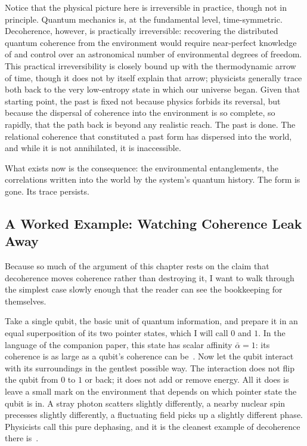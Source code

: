 Notice that the physical picture here is irreversible in practice, though not in principle.
Quantum mechanics is, at the fundamental level, time-symmetric.
Decoherence, however, is practically irreversible: recovering the distributed quantum coherence from the environment would require near-perfect knowledge of and control over an astronomical number of environmental degrees of freedom.
This practical irreversibility is closely bound up with the thermodynamic arrow of time, though it does not by itself explain that arrow; physicists generally trace both back to the very low-entropy state in which our universe began.
Given that starting point, the past is fixed not because physics forbids its reversal, but because the dispersal of coherence into the environment is so complete, so rapidly, that the path back is beyond any realistic reach.
The past is done.
The relational coherence that constituted a past form has dispersed into the world, and while it is not annihilated, it is inaccessible.

What exists now is the consequence: the environmental entanglements, the correlations written into the world by the system's quantum history.
The form is gone.
Its trace persists.

\subsection*{A Worked Example: Watching Coherence Leak Away}

Because so much of the argument of this chapter rests on the claim that decoherence moves coherence rather than destroying it, I want to walk through the simplest case slowly enough that the reader can see the bookkeeping for themselves.

Take a single qubit, the basic unit of quantum information, and prepare it in an equal superposition of its two pointer states, which I will call $0$ and $1$.
In the language of the companion paper, this state has scalar affinity $\bar{\alpha} = 1$: its coherence is as large as a qubit's coherence can be~\citep{AdamsRCT}.
Now let the qubit interact with its surroundings in the gentlest possible way.
The interaction does not flip the qubit from $0$ to $1$ or back; it does not add or remove energy.
All it does is leave a small mark on the environment that depends on which pointer state the qubit is in.
A stray photon scatters slightly differently, a nearby nuclear spin precesses slightly differently, a fluctuating field picks up a slightly different phase.
Physicists call this pure dephasing, and it is the cleanest example of decoherence there is~\citep{NielsenChuang2000}.

